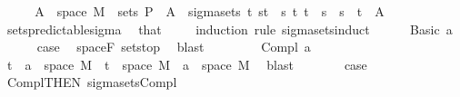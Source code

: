 \begin{isabellebody}
%
\isatagproof
{}\isamarkupfalse%
\ {\isacharminus}{\kern0pt}\isanewline
\ \ \isamarkupfalse%
\ {\isachardoublequoteopen}A\ {\isasymtimes}\ space\ M\ {\isasymin}\ sets\ {\isasymSigma}\isactrlsub P{\isachardoublequoteclose}\ \ {\isachardoublequoteopen}A\ {\isasymin}\ sigma{\isacharunderscore}{\kern0pt}sets\ {\isacharbraceleft}{\kern0pt}t\ {\isacharbraceleft}{\kern0pt}{\isacharbraceleft}{\kern0pt}s{\isacharless}{\kern0pt}{\isachardot}{\kern0pt}{\isachardot}{\kern0pt}t{\isacharbraceright}{\kern0pt}\ {\isacharbar}{\kern0pt}\ s\ t{\isachardot}{\kern0pt}\ t\ {\isasymle}\ s\ {\isasymand}\ s\ {\isacharless}{\kern0pt}\ t{\isacharbraceright}{\kern0pt}{\isachardoublequoteclose}\ \ A\ \isamarkupfalse%
\ sets{\isacharunderscore}{\kern0pt}predictable{\isacharunderscore}{\kern0pt}sigma\ \isamarkupfalse%
\ that\ \isanewline
\ \ \isamarkupfalse%
\ {\isacharparenleft}{\kern0pt}induction\ rule{\isacharcolon}{\kern0pt}\ sigma{\isacharunderscore}{\kern0pt}sets{\isachardot}{\kern0pt}induct{\isacharparenright}{\kern0pt}\isanewline
\ \ \ \ \isamarkupfalse%
\ {\isacharparenleft}{\kern0pt}Basic\ a{\isacharparenright}{\kern0pt}\isanewline
\ \ \ \ \isamarkupfalse%
\ {\isacharquery}{\kern0pt}case\ \isamarkupfalse%
\ space{\isacharunderscore}{\kern0pt}F\ sets{\isachardot}{\kern0pt}top\ \isamarkupfalse%
\ blast\isanewline
\ \ \isamarkupfalse%
\isanewline
\ \ \ \ \isamarkupfalse%
\ {\isacharparenleft}{\kern0pt}Compl\ a{\isacharparenright}{\kern0pt}\isanewline
\ \ \ \ \isamarkupfalse%
\ {\isachardoublequoteopen}{\isacharparenleft}{\kern0pt}{\isacharbraceleft}{\kern0pt}t\ {\isacharminus}{\kern0pt}\ a{\isacharparenright}{\kern0pt}\ {\isasymtimes}\ space\ M\ {\isacharequal}{\kern0pt}\ {\isacharbraceleft}{\kern0pt}t\ {\isasymtimes}\ space\ M\ {\isacharminus}{\kern0pt}\ a\ {\isasymtimes}\ space\ M{\isachardoublequoteclose}\ \isamarkupfalse%
\ blast\isanewline
\ \ \ \ \isamarkupfalse%
\ \isamarkupfalse%
\ {\isacharquery}{\kern0pt}case\ \isamarkupfalse%
\ Compl{\isacharparenleft}{\kern0pt}{}{\isacharparenright}{\kern0pt}{\isacharbrackleft}{\kern0pt}THEN\ sigma{\isacharunderscore}{\kern0pt}sets{\isachardot}{\kern0pt}Compl{\isacharbrackright}{\kern0pt}\ \isamarkupfalse%

\end{isabellebody}
